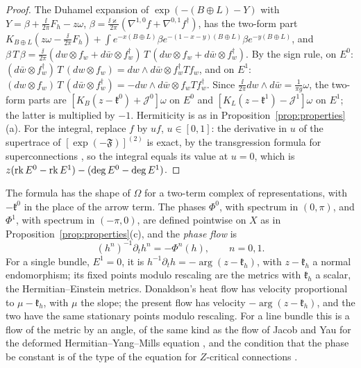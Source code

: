 \begin{proof}
The Duhamel expansion of $\exp(-(B\oplus L)-Y)$ with
$Y=\beta+\frac{\ii}{2\pi}F_h-z\omega$,
$\beta=\frac{\ii\varkappa}{2\pi}(\nabla^{1,0}f+\nabla^{0,1}f^\dagger)$, has
the two-form part
$K_{B\oplus L}(z\omega-\frac{\ii}{2\pi}F_h)+\int e^{-x(B\oplus L)}\beta e^{-(1-x-y)(B\oplus L)}\beta e^{-y(B\oplus L)}$,
and
$\beta\,T\,\beta=\frac{\ii}{2\pi}(dw\otimes f_w+d\bar w\otimes f_w^\dagger)\,T\,(dw\otimes f_w+d\bar w\otimes f_w^\dagger)$.
By the sign rule, on $E^0$:
$(d\bar w\otimes f_w^\dagger)\,T\,(dw\otimes f_w)=dw\wedge d\bar w\otimes f_w^\dagger Tf_w$,
and on $E^1$:
$(dw\otimes f_w)\,T\,(d\bar w\otimes f_w^\dagger)=-dw\wedge d\bar w\otimes f_wTf_w^\dagger$.
Since $\frac{\ii}{2\pi}dw\wedge d\bar w=\frac1{\pi g}\omega$, the two-form
parts are $[K_B(z-\mathfrak k^0)+\mathcal J^0]\omega$ on $E^0$ and
$[K_L(z-\mathfrak k^1)-\mathcal J^1]\omega$ on $E^1$; the latter is multiplied
by $-1$. Hermiticity is as in Proposition~\ref{prop:properties}(a). For the
integral, replace $f$ by $uf$, $u\in[0,1]$: the derivative in $u$ of the
supertrace of $[\exp(-\mathfrak F)]^{(2)}$ is exact, by the transgression
formula for superconnections \cite{qui85}, so the integral equals its value
at $u=0$, which is $z(\operatorname{rk} E^0-\operatorname{rk} E^1)-(\deg E^0-\deg E^1)$.
\end{proof}

The formula has the shape of $\Omega$ for a two-term complex of
representations, with $-\mathfrak k^0$ in the place of the arrow term. The
phases $\Phi^0$, with spectrum in $(0,\pi)$, and $\Phi^1$, with spectrum in
$(-\pi,0)$, are defined pointwise on $X$ as in
Proposition~\ref{prop:properties}(c), and the \emph{phase flow} is
\begin{equation}\label{eq:bundleflow}
 (h^n)^{-1}\partial_th^n=-\Phi^n(h),\qquad n=0,1 .
\end{equation}
For a single bundle, $E^1=0$, it is $h^{-1}\partial_th=-\arg(z-\mathfrak k_h)$,
with $z-\mathfrak k_h$ a normal endomorphism; its fixed points modulo
rescaling are the metrics with $\mathfrak k_h$ a scalar, the
Hermitian--Einstein metrics. Donaldson's heat flow \cite{don85} has velocity
proportional to $\mu-\mathfrak k_h$, with $\mu$ the slope; the present flow
has velocity $-\arg(z-\mathfrak k_h)$, and the two have the same stationary
points modulo rescaling. For a line bundle this is a flow of the metric
by an angle, of the same kind as the flow of Jacob and Yau for the deformed
Hermitian--Yang--Mills equation \cite[(1.2)]{jy17}, and the condition that
the phase be constant is of the type of the equation for $Z$-critical
connections \cite[Definition~2.22]{dms24}.

